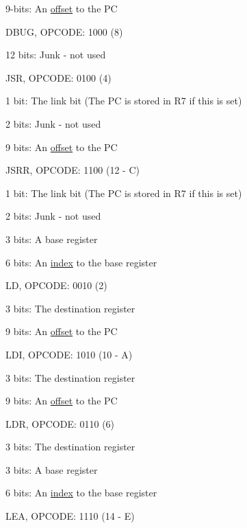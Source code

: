 \begin{DoxyItemize}
\begin{DoxyItemize}
\item 9-\/bits: An \hyperlink{index_offset}{offset} to the PC 
\end{DoxyItemize}\item DBUG, OPCODE: 1000 (8) 
\begin{DoxyItemize}
\item 12 bits: Junk -\/ not used 
\end{DoxyItemize}\item JSR, OPCODE: 0100 (4) 
\begin{DoxyItemize}
\item 1 bit: The link bit (The PC is stored in R7 if this is set) 
\item 2 bits: Junk -\/ not used 
\item 9 bits: An \hyperlink{index_offset}{offset} to the PC 
\end{DoxyItemize}\item JSRR, OPCODE: 1100 (12 -\/ C) 
\begin{DoxyItemize}
\item 1 bit: The link bit (The PC is stored in R7 if this is set) 
\item 2 bits: Junk -\/ not used 
\item 3 bits: A base register 
\item 6 bits: An \hyperlink{index_indexes}{index} to the base register 
\end{DoxyItemize}\item LD, OPCODE: 0010 (2) 
\begin{DoxyItemize}
\item 3 bits: The destination register 
\item 9 bits: An \hyperlink{index_offset}{offset} to the PC 
\end{DoxyItemize}\item LDI, OPCODE: 1010 (10 -\/ A) 
\begin{DoxyItemize}
\item 3 bits: The destination register 
\item 9 bits: An \hyperlink{index_offset}{offset} to the PC 
\end{DoxyItemize}\item LDR, OPCODE: 0110 (6) 
\begin{DoxyItemize}
\item 3 bits: The destination register 
\item 3 bits: A base register 
\item 6 bits: An \hyperlink{index_indexes}{index} to the base register 
\end{DoxyItemize}\item LEA, OPCODE: 1110 (14 -\/ E) 

\end{DoxyItemize}
